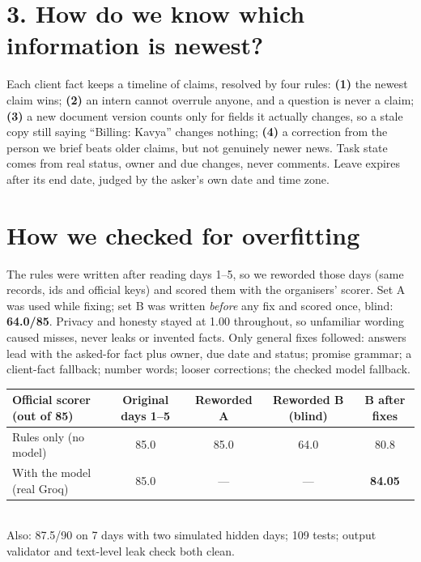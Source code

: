 \documentclass[10pt,a4paper]{article}
\begin{document}
\section{3. How do we know which information is newest?}
Each client fact keeps a timeline of claims, resolved by four rules: \textbf{(1)} the newest claim wins; \textbf{(2)} an
intern cannot overrule anyone, and a question is never a claim; \textbf{(3)} a new document version counts only for fields it
actually changes, so a stale copy still saying ``Billing: Kavya'' changes nothing; \textbf{(4)} a correction from the person
we brief beats older claims, but not genuinely newer news. Task state comes from real status, owner and due changes, never
comments. Leave expires after its end date, judged by the asker's own date and time zone.

\section{How we checked for overfitting}
The rules were written after reading days 1--5, so we reworded those days (same records, ids and official keys) and scored
them with the organisers' scorer. Set A was used while fixing; set B was written \emph{before} any fix and scored once,
blind: \textbf{64.0/85}. Privacy and honesty stayed at 1.00 throughout, so unfamiliar wording caused misses, never leaks or
invented facts. Only general fixes followed: answers lead with the asked-for fact plus owner, due date and status; promise
grammar; a client-fact fallback; number words; looser corrections; the checked model fallback.

\vspace{2pt}
\begin{center}\small
\begin{tabular}{lcccc}
\toprule
Official scorer (out of 85) & Original days 1--5 & Reworded A & Reworded B (blind) & B after fixes \\
\midrule
Rules only (no model)       & 85.0 & 85.0 & 64.0 & 80.8 \\
With the model (real Groq)  & 85.0 & ---  & ---  & \textbf{84.05} \\
\bottomrule
\end{tabular}\\[2pt]
{\color{muted}\footnotesize Also: 87.5/90 on 7 days with two simulated hidden days; 109 tests; output validator and text-level
leak check both clean.}
\end{center}
\end{document}
